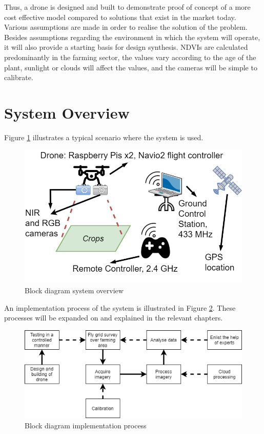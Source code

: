 Thus, a drone is designed and built to demonstrate proof of concept of a more cost effective model compared to solutions that exist in the market today.\\

Various assumptions are made in order to realise the solution of the problem. Besides assumptions regarding the environment in which the system will operate, it will also provide a starting basis for design synthesis. NDVIs are calculated predominantly in the farming sector, the values vary according to the age of the plant, sunlight or clouds will affect the values, and the cameras will be simple to calibrate.

\section{System Overview}

Figure \ref{fig:scenario} illustrates a typical scenario where the system is used.\\

\begin{figure}[H]
\centering
\includegraphics[scale=0.4]{images/drone_ndvi_scenario.png}
\caption{Block diagram system overview}
\label{fig:scenario}
\end{figure}

An implementation process of the system is illustrated in Figure \ref{fig:overview}. These processes will be expanded on and explained in the relevant chapters.

\begin{figure}[H]
\centering
\includegraphics[scale=0.6]{images/thesis_overview.png}
\caption{Block diagram implementation process}
\label{fig:overview}
\end{figure}

